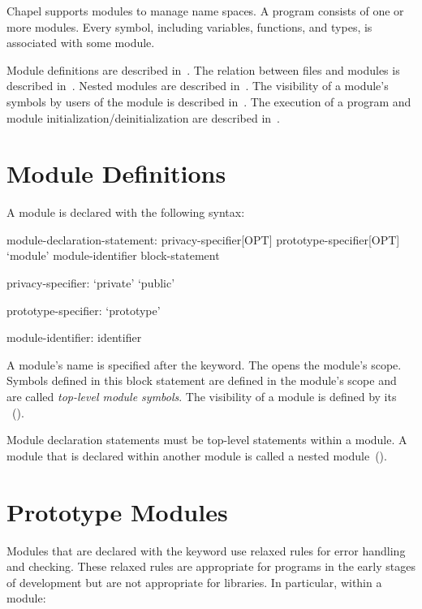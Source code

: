 \label{Modules}

Chapel supports modules to manage name spaces.  A program consists of
one or more modules.  Every symbol, including variables, functions,
and types, is associated with some module.

Module definitions are described in~.  The
relation between files and modules is described
in~.  Nested modules are described
in~.  The visibility of a module's symbols by
users of the module is described in~.  The execution
of a program and module initialization/deinitialization are described
in~.

\section{Module Definitions}
\label{Module_Definitions}

A module is declared with the following syntax:
\begin{syntax}
module-declaration-statement:
  privacy-specifier[OPT] prototype-specifier[OPT] `module' module-identifier block-statement

privacy-specifier:
  `private'
  `public'

prototype-specifier:
  `prototype'

module-identifier:
  identifier
\end{syntax}

A module's name is specified after the  keyword.
The  opens the module's scope.  Symbols defined
in this block statement are defined in the module's scope and are
called \emph{top-level module symbols}.  The visibility of a module is
defined by its ~().

Module declaration statements must be top-level statements within a
module.  A module that is declared within another module is called a
nested module~().

\section{Prototype Modules}
\label{Prototype_Modules}

Modules that are declared with the  keyword use relaxed
rules for error handling and  checking. These relaxed rules are
appropriate for programs in the early stages of development but are not
appropriate for libraries. In particular, within a  module:

